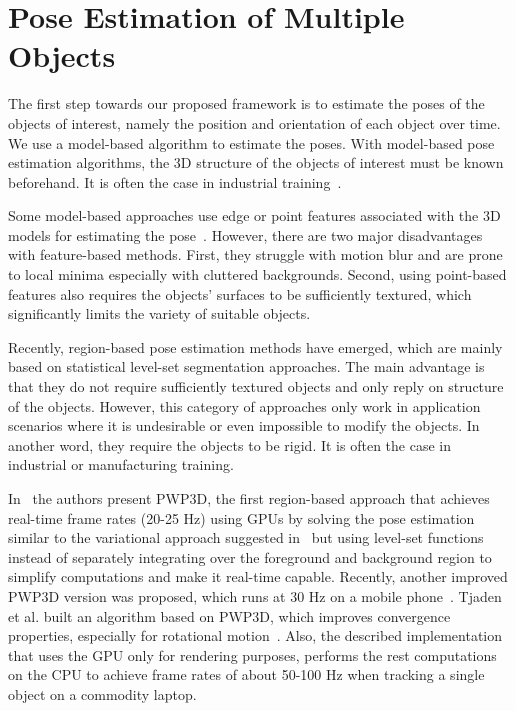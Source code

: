 \section{Pose Estimation of Multiple Objects}

The first step towards our proposed framework is to estimate the poses of the objects of interest, namely the position and orientation of each object over time.
We use a model-based algorithm to estimate the poses.
With model-based pose estimation algorithms, the 3D structure of the objects of interest must be known beforehand. It is often the case in industrial training~\cite{cremers2007}.

Some model-based approaches use edge or point features associated with the 3D models for estimating the pose~\cite{harris1990,vacchetti2004,park2008,kim2010}.
However, there are two major disadvantages with feature-based methods.
First, they struggle with motion blur and are prone to local minima especially with cluttered backgrounds.
Second, using point-based features also requires the objects' surfaces to be sufficiently textured, which significantly limits the variety of suitable objects.

Recently, region-based pose estimation methods have emerged, which are mainly based on statistical level-set segmentation approaches.
The main advantage is that they do not require sufficiently textured objects and only reply on structure of the objects.
However, this category of approaches only work in application scenarios where it is undesirable or even impossible to modify the objects. In another word, they require the objects to be rigid. It is often the case in industrial or manufacturing training.

In~\cite{prisacariu2012} the authors present PWP3D, the first region-based  approach that achieves real-time frame rates (20-25 Hz) using GPUs by solving the pose estimation similar to the variational approach suggested in~\cite{dambreville2010} but using level-set functions instead of separately integrating over the foreground and background region to simplify computations and make it real-time capable.
Recently, another improved PWP3D version was proposed, which runs at 30 Hz on a mobile phone~\cite{prisacariu2015}.
Tjaden et al. built an algorithm based on PWP3D, which improves convergence properties, especially for rotational motion~\cite{tjaden2016}. Also, the described implementation that uses the GPU only for rendering purposes, performs the rest computations on the CPU to achieve frame rates of about 50-100 Hz when tracking a single object on a commodity laptop.

